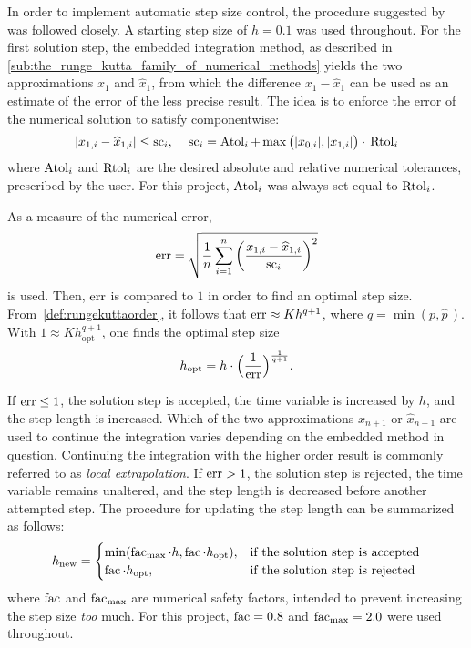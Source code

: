 In order to implement automatic step size control, the procedure suggested
by \textcite[pp.167--168]{hairer1993solving} was followed
closely. A starting step size of $h=0.1$ was used throughout. For the first
solution step, the embedded integration method, as described in
\cref{sub:the_runge_kutta_family_of_numerical_methods} yields the two
approximations $x_{1}$ and $\widehat{x}_{1}$, from which the difference
$x_{1}-\widehat{x}_{1}$ can be used as an estimate of the error of the less
precise result. The idea is to enforce the error of the numerical solution to
satisfy componentwise:
\begin{equation}
    \label{eq:embeddederror}
    \abs{x_{1,i}-\widehat{x}_{1,i}} \leq \scem_{i},\quad{}%
    \scem_{i}=\atol_{i}+\max\big(\abs{x_{0,i}},\abs{x_{1,i}}\big)\cdot{}\rtol_{i}
\end{equation}
where $\operatorname{Atol}_{i}$ and $\operatorname{Rtol}_{i}$ are the desired absolute and relative
numerical tolerances, prescribed by the user. For this project, $\operatorname{Atol}_{i}$ was
always set equal to $\operatorname{Rtol}_{i}$.

As a measure of the numerical error,
\begin{equation}
    \label{eq:embeddednumericalerror}
    \errem = \sqrt{\frac{1}{n}\sum\limits_{i=1}^{n}%
    {\bigg(\frac{x_{1,i}-\widehat{x}_{1,i}}{\scem_{i}}\bigg)}^{2}}
\end{equation}
is used. Then, $\operatorname{err}$ is compared to $1$ in order to find an optimal step
size. From~\cref{def:rungekuttaorder}, it follows that $\operatorname{err}\approx{}Kh^{q+1}$,
where $q=\min(p,\widehat{p}\,)$. With $1\approx{}Kh_{\mathrm{opt}}^{q+1}$,
one finds the optimal step size
\begin{equation}
    \label{eq:embeddedoptimalstepsize}
    h_{\mathrm{opt}}=h\cdot\Big(\frac{1}{\operatorname{err}}\Big)^{\frac{1}{q+1}}.
\end{equation}

If $\operatorname{err}\leq1$, the solution step is accepted, the time variable is increased
by $h$, and the step length is increased. Which of the two approximations
$x_{n+1}$ or $\widehat{x}_{n+1}$ are used to continue the integration varies
depending on the embedded method in question. Continuing the integration with
the higher order result is commonly referred to as \emph{local extrapolation}.
If $\operatorname{err}>1$, the solution step is rejected, the time variable remains
unaltered, and the step length is decreased before another attempted step. The
procedure for updating the step length can be summarized as follows:
\begin{equation}
    \label{eq:embeddedstepsizeadjustment}
h_{\mathrm{new}}=\begin{cases}%
    \min(\facem_{\mathrm{max}}\cdot{}h,\facem\cdot{}h_{\mathrm{opt}}),&
\textnormal{if the solution step is accepted}\\
\facem\cdot{}h_{\mathrm{opt}},&\textnormal{if the solution step is rejected}%
\end{cases}
\end{equation}
where $\operatorname{fac}$ and $\operatorname{fac}_{\mathrm{max}}$ are numerical safety factors,
intended to prevent increasing the step size \emph{too} much. For this project,
$\operatorname{fac}=0.8$ and $\operatorname{fac}_{\mathrm{max}}=2.0$ were used throughout.

